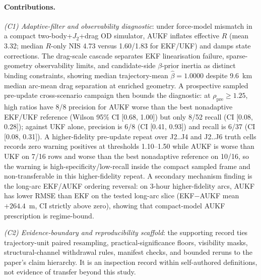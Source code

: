 \documentclass{article}
\begin{document}
\paragraph{Contributions.}
\emph{(C1) Adaptive-filter and observability diagnostic}: under force-model mismatch in a compact two-body+$J_2$+drag OD simulator, AUKF inflates effective \(R\) (mean 3.32; median \(R\)-only NIS 4.73 versus 1.60/1.83 for EKF/UKF) and damps state corrections. The drag-scale cascade separates EKF linearisation failure, sparse-geometry observability limits, and candidate-side \(\beta\)-prior inertia as distinct binding constraints, showing median trajectory-mean $\hat{\beta}=1.0000$ despite 9.6~km median arc-mean drag separation at enriched geometry. A prospective sampled pre-update cross-scenario campaign then bounds the diagnostic: at \(\rho_{\mathrm{pre}}\geq1.25\), high ratios have 8/8 precision for AUKF worse than the best nonadaptive EKF/UKF reference (Wilson 95\% CI [0.68, 1.00]) but only 8/52 recall (CI [0.08, 0.28]); against UKF alone, precision is 6/8 (CI [0.41, 0.93]) and recall is 6/37 (CI [0.08, 0.31]). A higher-fidelity pre-update repeat over J2..J4 and J2..J6 truth cells records zero warning positives at thresholds 1.10--1.50 while AUKF is worse than UKF on 7/16 rows and worse than the best nonadaptive reference on 10/16, so the warning is high-specificity/low-recall inside the compact sampled frame and non-transferable in this higher-fidelity repeat. A secondary mechanism finding is the long-arc EKF/AUKF ordering reversal: on 3-hour higher-fidelity arcs, AUKF has lower RMSE than EKF on the tested long-arc slice (EKF$-$AUKF mean $+264.4$~m, CI strictly above zero), showing that compact-model AUKF prescription is regime-bound.

\emph{(C2) Evidence-boundary and reproducibility scaffold}: the supporting record ties trajectory-unit paired resampling, practical-significance floors, visibility masks, structural-channel withdrawal rules, manifest checks, and bounded reruns to the paper's claim hierarchy. It is an inspection record within self-authored definitions, not evidence of transfer beyond this study.
\end{document}
